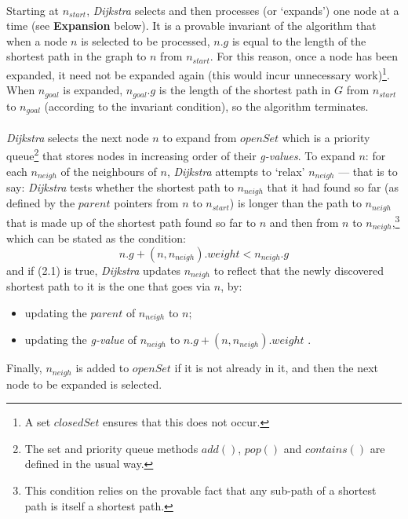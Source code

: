 \documentclass[12pt,notitlepage]{report}
\begin{document}
\\
\noindent
Starting at $n_{start}$, {\em Dijkstra} selects and then processes (or `expands') one node at a time (see {\bfseries Expansion} below). It is a provable\cite{CormenDijkstra} invariant of the algorithm that when a node $n$ is selected to be processed, $n.g$ is equal to the length of the shortest path in the graph to $n$ from $n_{start}$. For this reason, once a node has been expanded, it need not be expanded again (this would incur unnecessary work)\footnote{A set $closedSet$ ensures that this does not occur.}. When $n_{goal}$ is expanded, $n_{goal}.g$ is the length of the shortest path in $G$ from $n_{start}$ to $n_{goal}$ (according to the invariant condition), so the algorithm terminates.\\

\\
\noindent
{\em Dijkstra} selects the next node $n$ to expand from $openSet$ which is a priority queue\footnote{The set and priority queue methods $add()$, $pop()$ and  $contains()$ are defined in the usual way.} that stores nodes in increasing order of their {\em g-values}. To expand $n$: for each $n_{neigh}$ of the neighbours of $n$, {\em Dijkstra} attempts to `relax' $n_{neigh}$ --- that is to say: {\em Dijkstra} tests whether the shortest path to $n_{neigh}$ that it had found so far (as defined by the $parent$ pointers from $n$ to $n_{start}$) is longer than the path to $n_{neigh}$ that is made up of the shortest path found so far to $n$ and then from $n$ to $n_{neigh}$,\footnote{This condition relies on the provable\cite{CormenDijkstra} fact that any sub-path of a shortest path is itself a shortest path.} which can be stated as the condition:
\begin{equation}
n.g + (n,n_{neigh}).weight < n_{neigh}.g
\end{equation}
\noindent
and if (2.1) is true, {\em Dijkstra} updates $n_{neigh}$ to reflect that the newly discovered shortest path to it is the one that goes via $n$, by: 
\begin{itemize}
\item updating the $parent$ of $n_{neigh}$ to $n$;
\item updating the {\em g-value} of $n_{neigh}$ to $n.g + (n,n_{neigh}).weight$ .
\end{itemize}
Finally, $n_{neigh}$ is added to $openSet$ if it is not already in it, and then the next node to be expanded is selected.\\
\end{document}
